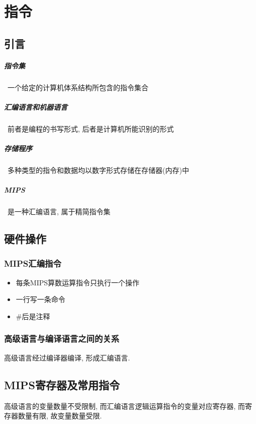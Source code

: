 \chapter{指令}
\section{引言}
\paragraph{指令集}~{一个给定的计算机体系结构所包含的指令集合} 
\paragraph{汇编语言和机器语言}~{前者是编程的书写形式, 后者是计算机所能识别的形式} 
\paragraph{存储程序}~{多种类型的指令和数据均以数字形式存储在存储器(内存)中}
\paragraph{MIPS}~{是一种汇编语言, 属于精简指令集}
\section{硬件操作}
\subsection{MIPS汇编指令}
\begin{itemize}
\item 每条MIPS算数运算指令只执行一个操作
\item 一行写一条命令
\item \#后是注释
\end{itemize}
\subsection{高级语言与编译语言之间的关系}
高级语言经过编译器编译, 形成汇编语言.
\section{MIPS寄存器及常用指令}
高级语言的变量数量不受限制, 而汇编语言逻辑运算指令的变量对应寄存器, 而寄存器数量有限, 故变量数量受限.
